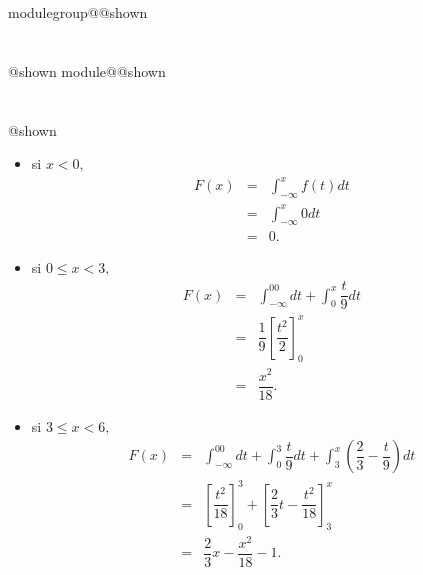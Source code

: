 \documentclass{Evaluation}
\makeatletter
\newcommand{\currentmodulekey}{}
\newcommand{\currentmoduletitle}{}
\newcommand{\currentgroupkey}{}
\newcommand{\currentgrouptitle}{}
\newcommand{\showmoduleifneeded}{%
  \ifx\currentgroupkey\empty\else
    \expandafter\ifx\csname modulegroup@\currentgroupkey @shown\endcsname\relax
      \section*{\currentgrouptitle}%
      \expandafter\gdef\csname modulegroup@\currentgroupkey @shown\endcsname{1}%
    \fi
  \fi
  \expandafter\ifx\csname module@\currentmodulekey @shown\endcsname\relax
    \section*{\currentmoduletitle}%
    \expandafter\gdef\csname module@\currentmodulekey @shown\endcsname{1}%
  \fi
}
\newenvironment{A22}{\showmoduleifneeded}{}
\makeatother
\begin{document}
\begin{questions}
\begin{A22}
\begin{parts}
\begin{solution}
\begin{itemize}\itemsep10pt
      \item[$\bullet$] si $x < 0,$ \begin{eqnarray*}
                                      F(x)  &=& \int_{-\infty}^x f(t)dt \\
                                            &=& \int_{-\infty}^x0dt \\
                                            &=& 0.
                                   \end{eqnarray*}

      \item[$\bullet$] si $0 \leq x < 3,$ \begin{eqnarray*}
                                      F(x)  &=& \int_{-\infty}^00dt + \int_0^x \dfrac{t}{9}dt \\
                                            &=& \dfrac{1}{9}\left[\dfrac{t^2}{2}\right]_0^x\\
                                            &=&  \dfrac{x^2}{18}.
                                   \end{eqnarray*}

      \item[$\bullet$] si $3 \leq x < 6,$ \begin{eqnarray*}
                                            F(x)    &=&  \int_{-\infty}^00dt + \int_0^3 \dfrac{t}{9}dt + \int_3^x\left(\dfrac{2}{3}-\dfrac{t}{9}\right)dt\\
                                                    &=&  \left[\dfrac{t^2}{18}\right]_0^3 + \left[\dfrac{2}{3}t -\dfrac{t^2}{18}\right]_3^x\\
                                                    &=&  \dfrac{2}{3}x -\dfrac{x^2}{18} -1.
                                   \end{eqnarray*}


\end{itemize}
\end{solution}
\end{parts}
\end{A22}
\end{questions}
\end{document}
